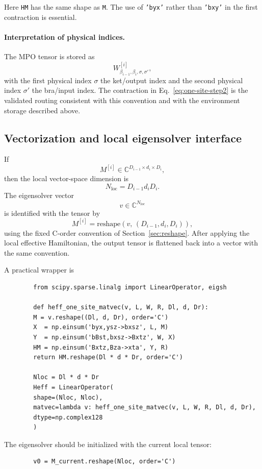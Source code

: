 \documentclass[aps,prb,onecolumn,nofootinbib]{revtex4-2}
\begin{document}
	Here \texttt{HM} has the same shape as \texttt{M}. The use of \texttt{'byx'} rather than
	\texttt{'bxy'} in the first contraction is essential.
	
	\paragraph{Interpretation of physical indices.}
	The MPO tensor is stored as
	\[
	W^{[i]}_{\beta_{i-1},\beta_i,\sigma,\sigma'},
	\]
	with the first physical index $\sigma$ the ket/output index and the second physical index
	$\sigma'$ the bra/input index. The contraction in Eq.~\eqref{eq:one-site-step2} is the
	validated routing consistent with this convention and with the environment storage described above.
	
	\subsection{Vectorization and local eigensolver interface}
	
	If
	\[
	M^{[i]} \in \mathbb{C}^{D_{i-1}\times d_i \times D_i},
	\]
	then the local vector-space dimension is
	\[
	N_{\mathrm{loc}} = D_{i-1} d_i D_i.
	\]
	The eigensolver vector
	\[
	v \in \mathbb{C}^{N_{\mathrm{loc}}}
	\]
	is identified with the tensor by
	\[
	M^{[i]} = \mathrm{reshape}(v,\,(D_{i-1},d_i,D_i)),
	\]
	using the fixed C-order convention of Section~\ref{sec:reshape}. After applying the local
	effective Hamiltonian, the output tensor is flattened back into a vector with the same convention.
	
	A practical wrapper is
	\begin{verbatim}
		from scipy.sparse.linalg import LinearOperator, eigsh
		
		def heff_one_site_matvec(v, L, W, R, Dl, d, Dr):
		M = v.reshape((Dl, d, Dr), order='C')
		X  = np.einsum('byx,ysz->bxsz', L, M)
		Y  = np.einsum('bBst,bxsz->Bxtz', W, X)
		HM = np.einsum('Bxtz,Bza->xta', Y, R)
		return HM.reshape(Dl * d * Dr, order='C')
		
		Nloc = Dl * d * Dr
		Heff = LinearOperator(
		shape=(Nloc, Nloc),
		matvec=lambda v: heff_one_site_matvec(v, L, W, R, Dl, d, Dr),
		dtype=np.complex128
		)
	\end{verbatim}
	
	The eigensolver should be initialized with the current local tensor:
	\begin{verbatim}
		v0 = M_current.reshape(Nloc, order='C')
	\end{verbatim}
	
\end{document}
